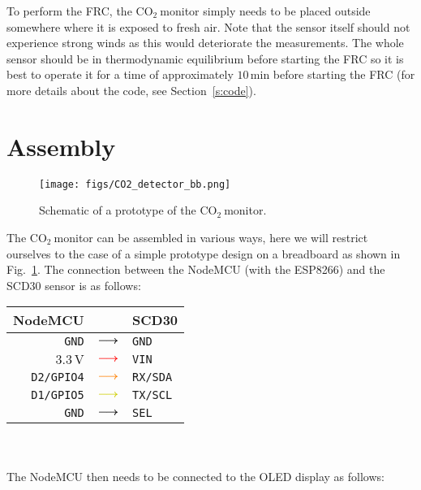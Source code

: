 \documentclass[12pt,a4paper]{article}
\newcommand*{\mathcolor}{}
\def\mathcolor#1#{\mathcoloraux{#1}}
\newcommand*{\mathcoloraux}[3]{%
  \protect\leavevmode
  \begingroup
    \color#1{#2}#3%
  \endgroup
}
\newcommand{\coo}{\ensuremath{\mathrm{CO_2}~}}
\begin{document}
To perform the FRC, the \coo monitor simply needs to be placed outside somewhere where it is exposed to fresh air. Note that the sensor itself should not experience strong winds as this would deteriorate the measurements. The whole sensor should be in thermodynamic equilibrium before starting the FRC so it is best to operate it for a time of approximately $10\,\mathrm{min}$ before starting the FRC (for more details about the code, see Section~\ref{s:code}).


\section{Assembly}
\begin{figure}[ht]
\center
\texttt{[image: figs/CO2\_detector\_bb.png]}
\caption{Schematic of a prototype of the \coo monitor.}
\label{f:CO2_fritzing}
\end{figure}
The \coo monitor can be assembled in various ways, here we will restrict ourselves to the case of a simple prototype design on a breadboard as shown in Fig.~\ref{f:CO2_fritzing}. The connection between the NodeMCU (with the ESP8266) and the SCD30 sensor is as follows:\\

\begin{tabular}{rcl}\toprule
	NodeMCU		& & SCD30\\\hline
	\texttt{GND}		& $\mathcolor{black}{\boldsymbol{\longrightarrow}}$	& \texttt{GND}\\
	$3.3\,\mathrm{V}$	& $\mathcolor{red}{\boldsymbol{\longrightarrow}}$		& \texttt{VIN}\\
	\texttt{D2/GPIO4}	& $\mathcolor{orange}{\boldsymbol{\longrightarrow}}$	& \texttt{RX/SDA}\\
	\texttt{D1/GPIO5}	& $\mathcolor{Yellow3}{\boldsymbol{\longrightarrow}}$	& \texttt{TX/SCL}\\
	\texttt{GND}		& $\mathcolor{black}{\boldsymbol{\longrightarrow}}$	& \texttt{SEL}\\	
	\bottomrule
\end{tabular}\\
\quad\\

The NodeMCU then needs to be connected to the OLED display as follows:\\
\end{document}
